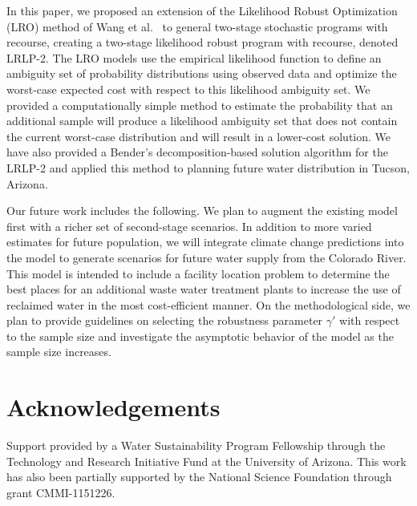 \documentclass[11pt]{article}
\begin{document}
In this paper, we proposed an extension of the Likelihood Robust Optimization (LRO) method of Wang et al.\ \cite{wang2010likelihood} to general two-stage stochastic programs with recourse, creating a two-stage likelihood robust program with recourse, denoted LRLP-2.
The LRO models use the empirical likelihood function to define an ambiguity set of probability distributions using observed data and optimize the worst-case expected cost with respect to this likelihood ambiguity set.
We provided a computationally simple method to estimate the probability that an additional sample will produce a likelihood ambiguity set that does not contain the current worst-case distribution and will result in a lower-cost solution. 
We have also provided a Bender's decomposition-based solution algorithm for the LRLP-2 and applied this method to planning future water distribution in Tucson, Arizona.

Our future work includes the following. We plan to augment the existing model first with a richer set of second-stage scenarios.
In addition to more varied estimates for future population, we will integrate climate change predictions into the model to generate scenarios for future water supply from the Colorado River. 
This model is intended to include a facility location problem to determine the best places for an additional waste water treatment plants to increase the use of reclaimed water in the most cost-efficient manner. On the methodological side, we plan to provide guidelines on selecting the robustness parameter $\gamma'$ with respect to the sample size and investigate the asymptotic behavior of the model as the sample size increases. 

\section*{Acknowledgements}
Support provided by a Water Sustainability Program Fellowship through the Technology and Research Initiative Fund at the University of Arizona.
This work has also been partially supported by the National Science Foundation through grant CMMI-1151226.


\end{document}
